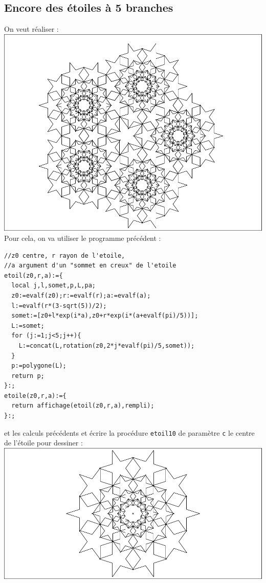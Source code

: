 \documentclass[a4paper,11pt]{book}
\begin{document}
\subsection{Encore des \'etoiles \`a 5 branches}
On veut r\'ealiser :\\
\includegraphics[width=\textwidth]{casetoil}\\
Pour cela, on va utiliser le programme  pr\'ec\'edent :
\begin{verbatim}
//z0 centre, r rayon de l'etoile, 
//a argument d'un "sommet en creux" de l'etoile
etoil(z0,r,a):={
  local j,l,somet,p,L,pa;
  z0:=evalf(z0);r:=evalf(r);a:=evalf(a);
  l:=evalf(r*(3-sqrt(5))/2);
  somet:=[z0+l*exp(i*a),z0+r*exp(i*(a+evalf(pi)/5))];
  L:=somet;
  for (j:=1;j<5;j++){
    L:=concat(L,rotation(z0,2*j*evalf(pi)/5,somet));
  }
  p:=polygone(L);
  return p;
}:;
etoile(z0,r,a):={
  return affichage(etoil(z0,r,a),rempli);
}:;

\end{verbatim}
et les calculs pr\'ec\'edents et \'ecrire la proc\'edure {\tt etoil10} de 
param\`etre {\tt c} le centre de l'\'etoile pour dessiner :\\
\includegraphics[width=\textwidth]{casetoil10}\\
\end{document}
